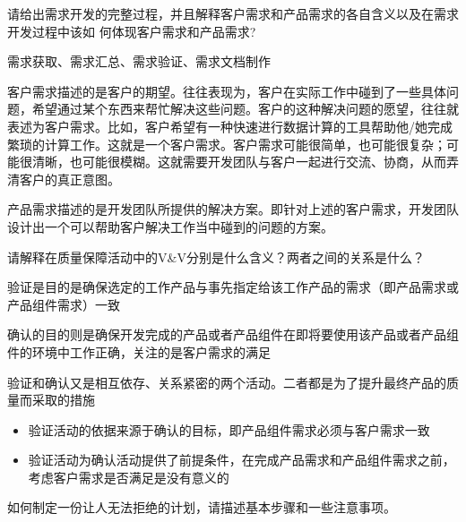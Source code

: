 \begin{problem}[2015]
请给出需求开发的完整过程，并且解释客户需求和产品需求的各自含义以及在需求开发过程中该如 何体现客户需求和产品需求?
\end{problem}

\begin{solution}
需求获取、需求汇总、需求验证、需求文档制作

客户需求描述的是客户的期望。往往表现为，客户在实际工作中碰到了一些具体问题，希望通过某个东⻄来帮忙解决这些问题。客户的这种解决问题的愿望，往往就表述为客户需求。比如，客户希望有一种快速进行数据计算的工具帮助他/她完成繁琐的计算工作。这就是一个客户需求。客户需求可能很简单，也可能很复杂；可能很清晰，也可能很模糊。这就需要开发团队与客户一起进行交流、协商，从而弄清客户的真正意图。

产品需求描述的是开发团队所提供的解决方案。即针对上述的客户需求，开发团队设计出一个可以帮助客户解决工作当中碰到的问题的方案。
\end{solution}



\begin{problem}[2015B]
请解释在质量保障活动中的V\&V分别是什么含义？两者之间的关系是什么？
\end{problem}

\begin{solution}
验证是目的是确保选定的工作产品与事先指定给该工作产品的需求（即产品需求或产品组件需求）一致

确认的目的则是确保开发完成的产品或者产品组件在即将要使用该产品或者产品组件的环境中工作正确，关注的是客户需求的满足

验证和确认又是相互依存、关系紧密的两个活动。二者都是为了提升最终产品的质量而采取的措施
\begin{itemize}
    \item 验证活动的依据来源于确认的目标，即产品组件需求必须与客户需求一致
    \item 验证活动为确认活动提供了前提条件，在完成产品需求和产品组件需求之前，考虑客户需求是否满足是没有意义的
\end{itemize}
\end{solution}



\begin{problem}[2013、2014、2015A、2015B、2016]
如何制定一份让人无法拒绝的计划，请描述基本步骤和一些注意事项。
\end{problem}

